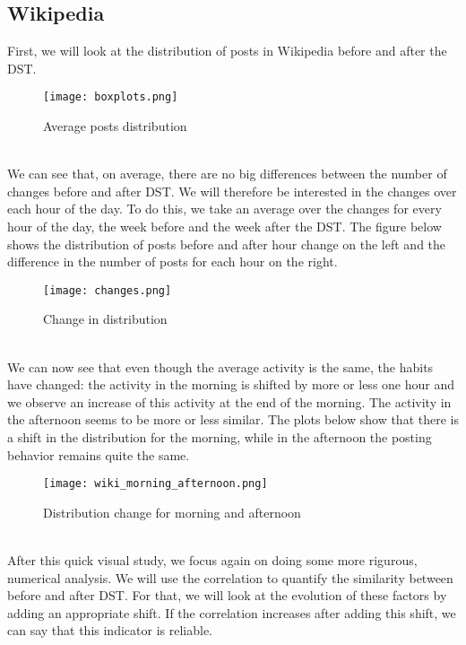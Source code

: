 \documentclass[11pt]{article}
\begin{document}
\subsection{Wikipedia}
First, we will look at the distribution of posts in Wikipedia before and after the DST.
\begin{figure}[h!]
\centering
\texttt{[image: boxplots.png]}
\caption{Average posts distribution}
\end{figure}\\
We can see that, on average, there are no big differences between the number of changes before and after DST.
We will therefore be interested in the changes over each hour of the day. To do this, we take an average over the changes for every hour of the day, the week before and the week after the DST. The figure below shows the distribution of posts before and after hour change on the left and the difference in the number of posts for each hour on the right.
\begin{figure}[h!]
\centering
\texttt{[image: changes.png]}
\caption{Change in distribution}
\end{figure}\\
We can now see that even though the average activity is the same, the habits have changed: the activity in the morning is shifted by more or less one hour and we observe an increase of this activity at the end of the morning. The activity in the afternoon seems to be more or less similar.
The plots below show that there is a shift in the distribution for the morning, while in the afternoon the posting behavior remains quite the same.\\
\begin{figure}[h]
\centering
\texttt{[image: wiki\_morning\_afternoon.png]}
\caption{Distribution change for morning and afternoon}
\end{figure}\\
After this quick visual study, we focus again on doing some more rigurous, numerical analysis. We will use the correlation to quantify the similarity between before and after DST.
For that, we will look at the evolution of these factors by adding an appropriate shift. If the correlation increases after adding this shift, we can say that this indicator is reliable.\\
\begin{table}[h!]
\caption{Correlations before and after shifting after hour change data}\label{table:dstchangesgym}
\end{table}
\end{document}
